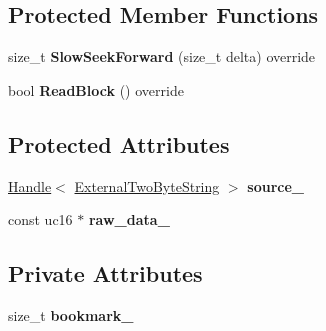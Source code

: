 \subsection*{Protected Member Functions}
\begin{DoxyCompactItemize}
\item 
size\+\_\+t {\bfseries Slow\+Seek\+Forward} (size\+\_\+t delta) override\hypertarget{classv8_1_1internal_1_1_external_two_byte_string_utf16_character_stream_abf0f9a983f8e60a23825b9f4bfe7e6ff}{}\label{classv8_1_1internal_1_1_external_two_byte_string_utf16_character_stream_abf0f9a983f8e60a23825b9f4bfe7e6ff}

\item 
bool {\bfseries Read\+Block} () override\hypertarget{classv8_1_1internal_1_1_external_two_byte_string_utf16_character_stream_a10a6c535605f20f481cfda7e77e99b84}{}\label{classv8_1_1internal_1_1_external_two_byte_string_utf16_character_stream_a10a6c535605f20f481cfda7e77e99b84}

\end{DoxyCompactItemize}
\subsection*{Protected Attributes}
\begin{DoxyCompactItemize}
\item 
\hyperlink{classv8_1_1internal_1_1_handle}{Handle}$<$ \hyperlink{classv8_1_1internal_1_1_external_two_byte_string}{External\+Two\+Byte\+String} $>$ {\bfseries source\+\_\+}\hypertarget{classv8_1_1internal_1_1_external_two_byte_string_utf16_character_stream_a09eb9109a053bf71a42d3830e5b9e9c2}{}\label{classv8_1_1internal_1_1_external_two_byte_string_utf16_character_stream_a09eb9109a053bf71a42d3830e5b9e9c2}

\item 
const uc16 $\ast$ {\bfseries raw\+\_\+data\+\_\+}\hypertarget{classv8_1_1internal_1_1_external_two_byte_string_utf16_character_stream_afd50205c07147770b784f86ba3b09929}{}\label{classv8_1_1internal_1_1_external_two_byte_string_utf16_character_stream_afd50205c07147770b784f86ba3b09929}

\end{DoxyCompactItemize}
\subsection*{Private Attributes}
\begin{DoxyCompactItemize}
\item 
size\+\_\+t {\bfseries bookmark\+\_\+}\hypertarget{classv8_1_1internal_1_1_external_two_byte_string_utf16_character_stream_a542a762aeb143b57f6eafee4f0870c99}{}\label{classv8_1_1internal_1_1_external_two_byte_string_utf16_character_stream_a542a762aeb143b57f6eafee4f0870c99}

\end{DoxyCompactItemize}
